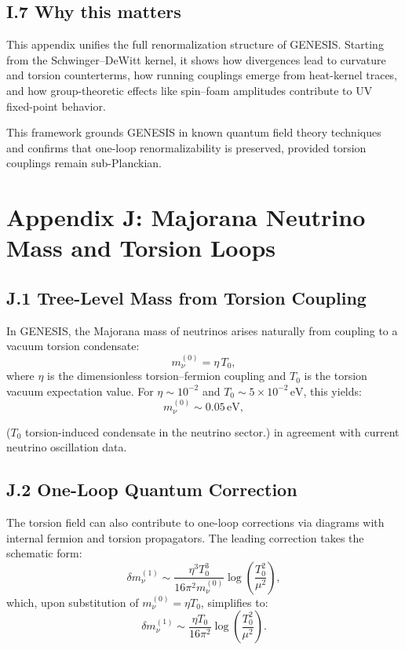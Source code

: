 \documentclass{article}
\begin{document}
\subsection*{I.7 Why this matters}
\begin{tcolorbox}[colback=gray!5, colframe=black!30, title=Why this matters]
This appendix unifies the full renormalization structure of GENESIS. Starting from the Schwinger–DeWitt kernel, it shows how divergences lead to curvature and torsion counterterms, how running couplings emerge from heat-kernel traces, and how group-theoretic effects like spin–foam amplitudes contribute to UV fixed-point behavior.

This framework grounds GENESIS in known quantum field theory techniques and confirms that one-loop renormalizability is preserved, provided torsion couplings remain sub-Planckian.
\end{tcolorbox}



\section*{Appendix J: Majorana Neutrino Mass and Torsion Loops}
\label{app:neutrino-loop}

\subsection*{J.1 Tree-Level Mass from Torsion Coupling}
In GENESIS, the Majorana mass of neutrinos arises naturally from coupling to a vacuum torsion condensate:
\begin{equation}
m_\nu^{(0)} = \eta\,T_0,
\end{equation}
where $\eta$ is the dimensionless torsion–fermion coupling and $T_0$ is the torsion vacuum expectation value. For $\eta \sim 10^{-2}$ and $T_0 \sim 5 \times 10^{-2}$\,$\mathrm{eV}$, this yields:
\[
m_\nu^{(0)} \sim 0.05\,\text{eV},
\]

($T_0$ torsion-induced condensate in the neutrino sector.)
in agreement with current neutrino oscillation data.

\subsection*{J.2 One-Loop Quantum Correction}
The torsion field can also contribute to one-loop corrections via diagrams with internal fermion and torsion propagators. The leading correction takes the schematic form:
\begin{equation}
\delta m_\nu^{(1)} \sim \frac{\eta^3 T_0^3}{16\pi^2 m_\nu^{(0)}} \log \left( \frac{T_0^2}{\mu^2} \right),
\end{equation}
which, upon substitution of $m_\nu^{(0)} = \eta T_0$, simplifies to:
\begin{equation}
\delta m_\nu^{(1)} \sim \frac{\eta T_0}{16\pi^2} \log \left( \frac{T_0^2}{\mu^2} \right).
\end{equation}
\end{document}

